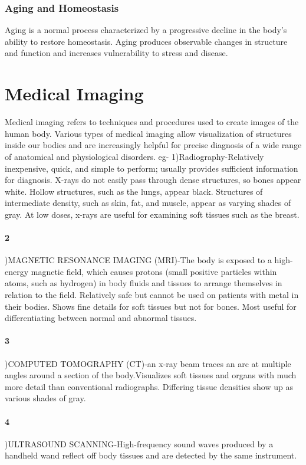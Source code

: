 \documentclass[11pt]{article}
\begin{document}
\subsubsection{Aging and Homeostasis}
Aging is a normal process characterized by a
progressive decline in the body’s ability to restore homeostasis.
Aging produces observable changes in structure and function and
increases vulnerability to stress and disease.
\section{Medical Imaging}
Medical imaging refers to techniques and procedures used to create
images of the human body. Various types of medical imaging allow
visualization of structures inside our bodies and are increasingly
helpful for precise diagnosis of a wide range of anatomical and physiological  disorders.
eg- 1)Radiography-Relatively inexpensive, quick, and simple to perform; usually
provides sufficient information for diagnosis. X-rays do not easily pass
through dense structures, so bones appear white. Hollow structures,
such as the lungs, appear black. Structures of intermediate density, such
as skin, fat, and muscle, appear as varying shades of gray. At low doses,
x-rays are useful for examining soft tissues such as the breast.
\paragraph{2})MAGNETIC RESONANCE IMAGING (MRI)-The body is exposed to a high-energy magnetic field, which
causes protons (small positive particles within atoms, such as hydrogen)
in body fluids and tissues to arrange themselves in relation to the field.
Relatively safe but cannot be used on patients with metal
in their bodies. Shows fine details for soft tissues but not for bones.
Most useful for differentiating between normal and abnormal tissues.
\paragraph{3})COMPUTED TOMOGRAPHY (CT)-an x-ray
beam traces an arc at multiple angles around a section of the body.Visualizes soft tissues and organs with much more detail
than conventional radiographs. Differing tissue densities show up as
various shades of gray.
\paragraph{4})ULTRASOUND SCANNING-High-frequency sound waves produced by a handheld wand reflect
off body tissues and are detected by the same instrument.
\end{document}
